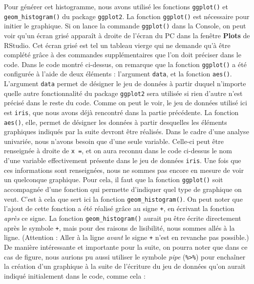 \documentclass[
  french,
]{book}
\newenvironment{Shaded}{\begin{snugshade}}{\end{snugshade}}
\newcommand{\CommentTok}[1]{\textcolor[rgb]{0.56,0.35,0.01}{\textit{#1}}}
\newcommand{\DataTypeTok}[1]{\textcolor[rgb]{0.13,0.29,0.53}{#1}}
\newcommand{\KeywordTok}[1]{\textcolor[rgb]{0.13,0.29,0.53}{\textbf{#1}}}
\newcommand{\NormalTok}[1]{#1}
\newcommand{\OperatorTok}[1]{\textcolor[rgb]{0.81,0.36,0.00}{\textbf{#1}}}
\newcommand{\StringTok}[1]{\textcolor[rgb]{0.31,0.60,0.02}{#1}}
\begin{document}
Pour générer cet histogramme, nous avons utilisé les fonctions \texttt{ggplot()} et \texttt{geom\_histogram()} du package \texttt{ggplot2}. La fonction \texttt{ggplot()} est nécessaire pour initier le graphique. Si on lance la commande \texttt{ggplot()} dans la Console, on peut voir qu'un écran grisé apparaît à droite de l'écran du PC dans la fenêtre \textbf{Plots} de RStudio. Cet écran grisé est tel un tableau vierge qui ne demande qu'à être complété grâce à des commandes supplémentaires que l'on doit préciser dans le code. Dans le code montré ci-dessus, on remarque que la fonction \texttt{ggplot()} a été configurée à l'aide de deux éléments : l'argument \texttt{data}, et la fonction \texttt{aes()}. L'argument \texttt{data} permet de désigner le jeu de données à partir duquel n'importe quelle autre fonctionnalité du package \texttt{ggplot2} sera utilisée si rien d'autre n'est précisé dans le reste du code. Comme on peut le voir, le jeu de données utilisé ici est \texttt{iris}, que nous avons déjà rencontré dans la partie précédente. La fonction \texttt{aes()}, elle, permet de désigner les données à partir desquelles les éléments graphiques indiqués par la suite devront être réalisés. Dans le cadre d'une analyse univariée, nous n'avons besoin que d'une seule variable. Celle-ci peut être renseignée à droite de \texttt{x\ =}, et on aura reconnu dans le code ci-dessus le nom d'une variable effectivement présente dans le jeu de données \texttt{iris}. Une fois que ces informations sont renseignées, nous ne sommes pas encore en mesure de voir un quelconque graphique. Pour cela, il faut que la fonction \texttt{ggplot()} soit accompagnée d'une fonction qui permette d'indiquer quel type de graphique on veut. C'est à cela que sert ici la fonction \texttt{geom\_histogram()}. On peut noter que l'ajout de cette fonction a été réalisé grâce au signe \texttt{+}, en écrivant la fonction \emph{après} ce signe. La fonction \texttt{geom\_histogram()} aurait pu être écrite directement après le symbole \texttt{+}, mais pour des raisons de lisibilité, nous sommes allés à la ligne. (Attention : Aller à la ligne \emph{avant} le signe \texttt{+} n'est en revanche pas possible.) De manière intéressante et importante pour la suite, on pourra noter que dans ce cas de figure, nous aurions pu aussi utiliser le symbole \emph{pipe} (\texttt{\%\textgreater{}\%}) pour enchaîner la création d'un graphique à la suite de l'écriture du jeu de données qu'on aurait indiqué initialement dans le code, comme cela :

\begin{Shaded}
\end{Shaded}
\end{document}
